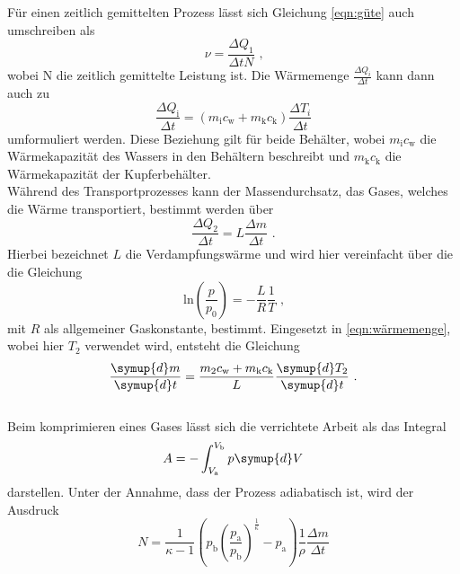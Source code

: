 \noindent Für einen zeitlich gemittelten Prozess lässt sich Gleichung \ref{eqn:güte} auch umschreiben als
\begin{equation}
    \nu=\frac{\Delta Q_1}{\Delta tN} \text{ ,}
    \label{eqn:gütemittel}
\end{equation}
wobei N die zeitlich gemittelte Leistung ist. Die Wärmemenge $\frac{\Delta Q_i}{\Delta t}$ kann dann auch zu
\begin{equation}
    \frac{\Delta Q_{\mathrm{i}}}{\Delta t}=(m_{\mathrm{i}}c_{\mathrm{w}}+m_{\mathrm{k}}c_{\mathrm{k}})\frac{\Delta T_i}{\Delta t}
    \label{eqn:wärmemenge}
\end{equation}
umformuliert werden. Diese Beziehung gilt für beide Behälter, wobei $m_{\mathrm{i}}c_{\mathrm{w}}$ die Wärmekapazität des Wassers
in den Behältern beschreibt und $m_{\mathrm{k}}c_{\mathrm{k}}$ die Wärmekapazität der Kupferbehälter.\\

\noindent Während des Transportprozesses kann der Massendurchsatz, das Gases, welches die
Wärme transportiert, bestimmt werden über
\begin{equation}
    \frac{\Delta Q_2}{\Delta t}=L\frac{\Delta m}{\Delta t} \text{ .}
\end{equation}
Hierbei bezeichnet $L$ die Verdampfungswärme und wird hier vereinfacht über die die Gleichung
\begin{equation}
    \mathrm{ln} \left(\frac{p}{p_0}\right)=-\frac{L}{R}\frac{1}{T}   \text{ ,}
    \label{eqn:verdampf}
\end{equation}
mit $R$ als allgemeiner Gaskonstante, bestimmt. Eingesetzt in \ref{eqn:wärmemenge}, wobei hier $T_2$ verwendet wird, 
entsteht die Gleichung
\begin{equation}
    \frac{\symup{d}m}{\symup{d}t}=\frac{m_2c_{\mathrm{w}}+m_{\mathrm{k}}c_{\mathrm{k}}}{L}\frac{\symup{d}T_2}{\symup{d}t} \text{ .}
    \label{eqn:masse}
\end{equation}
\\

\noindent Beim komprimieren eines Gases lässt sich die verrichtete Arbeit als das Integral
\begin{equation}
    A=-\int_{V_{\mathrm{a}}}^{V_{\mathrm{b}}}p \symup{d}V
\end{equation}
darstellen. Unter der Annahme, dass der Prozess adiabatisch ist, wird der Ausdruck
\begin{equation}
    N=\frac{1}{\kappa -1}\left(p_{\mathrm{b}}\left(\frac{p_{\mathrm{a}}}{p_{\mathrm{b}}}\right)^{\frac{1}{\kappa}}-p_{\mathrm{a}}\right)\frac{1}{\rho}\frac{\Delta m}{\Delta t}
    \label{eqn:leistung}
\end{equation}